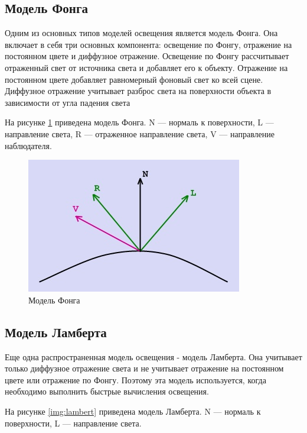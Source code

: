 \subsection{Модель Фонга}
Одним из основных типов моделей освещения является модель Фонга. 
Она включает в себя три основных компонента: освещение по Фонгу, 
отражение на постоянном цвете и диффузное отражение\cite{light}. Освещение по Фонгу 
рассчитывает отраженный свет от источника света и добавляет его к объекту. 
Отражение на постоянном цвете добавляет равномерный фоновый свет ко всей 
сцене. Диффузное отражение учитывает разброс света на поверхности объекта 
в зависимости от угла падения света

На рисунке \ref{img:fong} приведена модель Фонга.
N — нормаль к поверхности, L — направление света, R — отраженное направление света,
V — направление наблюдателя.

\begin{figure}[H]
	\begin{center}
		\includegraphics[scale=0.9]{img/fong.jpg}
	\end{center}
	\captionsetup{justification=centering}
	\caption{Модель Фонга}
	\label{img:fong}
\end{figure}


\subsection{Модель Ламберта}
Еще одна распространенная модель освещения - модель Ламберта. Она 
учитывает только диффузное отражение света и не учитывает отражение на 
постоянном цвете или отражение по Фонгу\cite{light}. Поэтому эта модель используется, 
когда необходимо выполнить быстрые вычисления освещения.

На рисунке \ref{img:lambert} приведена модель Ламберта.
N — нормаль к поверхности, L — направление света.

